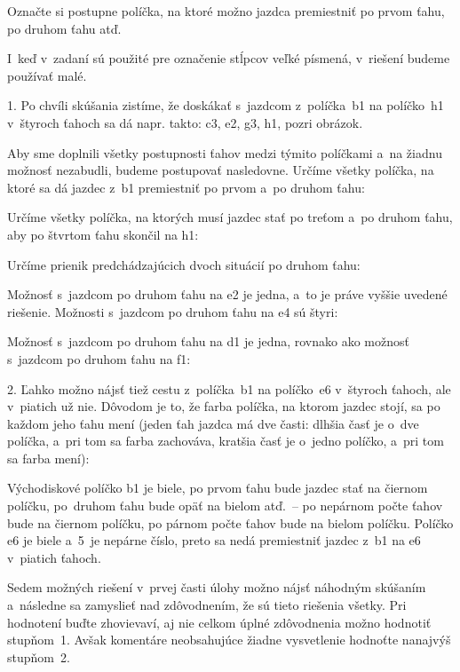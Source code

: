 {%
\napad
Označte si postupne políčka, na ktoré možno jazdca premiestniť po prvom ťahu, po druhom ťahu atď.

\riesenie
I~keď v~zadaní sú použité pre označenie stĺpcov veľké písmená, v~riešení budeme používať malé.

1.
Po chvíli skúšania zistíme, že doskákať s~jazdcom z~políčka~b1 na políčko~h1 v~štyroch ťahoch sa dá napr. takto: c3, e2, g3, h1, pozri obrázok.
%


Aby sme doplnili všetky postupnosti ťahov medzi týmito políčkami a~na žiadnu možnosť nezabudli, budeme postupovať nasledovne.
Určíme všetky políčka, na ktoré sa dá jazdec z~b1 premiestniť po prvom a~po druhom ťahu:
%


\noindent
Určíme všetky políčka, na ktorých musí jazdec stať po treťom a~po druhom ťahu, aby po štvrtom ťahu skončil na h1:
%


\noindent
Určíme prienik predchádzajúcich dvoch situácií po druhom ťahu:
%


Možnosť s~jazdcom po druhom ťahu na e2 je jedna,
a~to je práve vyššie uvedené riešenie.
Možnosti s~jazdcom po druhom ťahu na e4 sú štyri:
%


\noindent
Možnosť s~jazdcom po druhom ťahu na d1 je jedna, rovnako ako možnosť s~jazdcom po druhom ťahu na f1:
%



2.
Ľahko možno nájsť tiež cestu z~políčka~b1 na políčko~e6 v~štyroch ťahoch, ale v~piatich už nie.
Dôvodom je to, že farba políčka, na ktorom jazdec stojí, sa po každom jeho ťahu mení (jeden ťah jazdca má dve časti: dlhšia časť je o~dve políčka, a~pri tom sa farba zachováva, kratšia časť je o~jedno políčko, a~pri tom sa farba mení):

Východiskové políčko b1 je biele, po prvom ťahu bude jazdec stať na čiernom políčku, po~druhom ťahu bude opäť na bielom atď.~-- po nepárnom počte ťahov bude na čiernom políčku, po párnom počte ťahov bude na bielom políčku.
Políčko e6 je biele a~5~je nepárne číslo, preto sa nedá premiestniť jazdec z~b1 na e6 v~piatich ťahoch.

\poznamka
Sedem možných riešení v~prvej časti úlohy možno nájsť náhodným skúšaním a~následne sa zamyslieť nad zdôvodnením, že sú tieto riešenia všetky.
Pri hodnotení buďte zhovievaví, aj nie celkom úplné zdôvodnenia možno hodnotiť stupňom~1.
Avšak komentáre neobsahujúce žiadne vysvetlenie hodnoťte nanajvýš stupňom~2.
}

